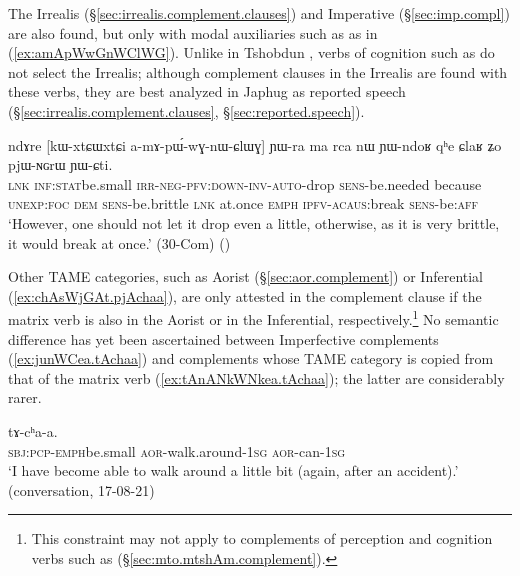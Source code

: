 The Irrealis (§\ref{sec:irrealis.complement.clauses}) and Imperative (§\ref{sec:imp.compl}) are also found, but only with modal auxiliaries such as  as in (\ref{ex:amApWwGnWClWG}). Unlike in Tshobdun \citep[807]{jackson07irrealis},  verbs of cognition such as  do not select the Irrealis; although complement clauses in the Irrealis are found with these verbs, they are best analyzed in Japhug as reported speech (§\ref{sec:irrealis.complement.clauses}, §\ref{sec:reported.speech}). 

\begin{exe}
\ex \label{ex:amApWwGnWClWG}
\gll  ndɤre [kɯ-xtɕɯ\redp{}xtɕi a-mɤ-pɯ́-wɣ-nɯ-ɕlɯɣ] ɲɯ-ra ma rca nɯ ɲɯ-ndoʁ qʰe ɕlaʁ ʑo pjɯ-ɴɢrɯ ɲɯ-ɕti. \\
\textsc{lnk} \textsc{inf}:\textsc{stat}\redp{}be.small \textsc{irr}-\textsc{neg}-\textsc{pfv}:\textsc{down}-\textsc{inv}-\textsc{auto}-drop \textsc{sens}-be.needed because \textsc{unexp}:\textsc{foc} \textsc{dem} \textsc{sens}-be.brittle \textsc{lnk} at.once \textsc{emph} \textsc{ipfv}-\textsc{acaus}:break \textsc{sens}-be:\textsc{aff} \\
\glt `However, one should not let it drop even a little, otherwise, as it is very brittle, it would break at once.' (30-Com)
()
\end{exe}

Other TAME categories, such as Aorist (§\ref{sec:aor.complement}) or Inferential (\ref{ex:chAsWjGAt.pjAchaa}), are only attested in the complement clause if the matrix verb is also in the Aorist or in the Inferential, respectively.\footnote{This constraint may not apply to complements of perception and cognition verbs such as  (§\ref{sec:mto.mtshAm.complement}). } No semantic difference has yet been ascertained between Imperfective complements (\ref{ex:junWCea.tAchaa}) and complements whose TAME category is copied from that of the matrix verb (\ref{ex:tAnANkWNkea.tAchaa}); the latter are considerably rarer.

\begin{exe}
\ex \label{ex:tAnANkWNkea.tAchaa}
  tɤ-cʰa-a. \\
 \textsc{sbj}:\textsc{pcp}-\textsc{emph}\redp{}be.small \textsc{aor}-walk.around-\textsc{1sg} \textsc{aor}-can-\textsc{1sg} \\
 \glt `I have become able to walk around a little bit (again, after an accident).' (conversation, 17-08-21)
\end{exe}

